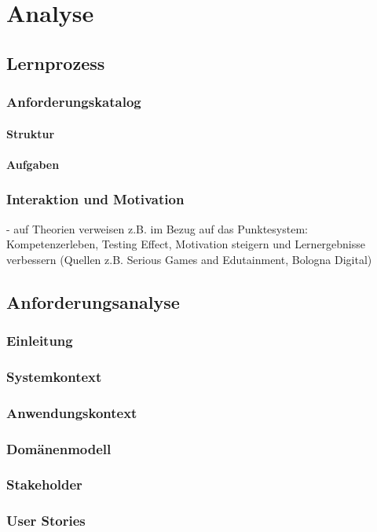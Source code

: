 \chapter{Analyse}

\section{Lernprozess}
\subsection{Anforderungskatalog}
\subsubsection{Struktur}
\subsubsection{Aufgaben}
\subsection{Interaktion und Motivation}
- auf Theorien verweisen z.B. im Bezug auf das Punktesystem: Kompetenzerleben, Testing Effect, Motivation steigern und Lernergebnisse verbessern (Quellen z.B. Serious Games and Edutainment, Bologna Digital)

\section{Anforderungsanalyse}
\subsection{Einleitung}
\subsection{Systemkontext}
\subsection{Anwendungskontext}
\subsection{Domänenmodell}
\subsection{Stakeholder}
\subsection{User Stories}

